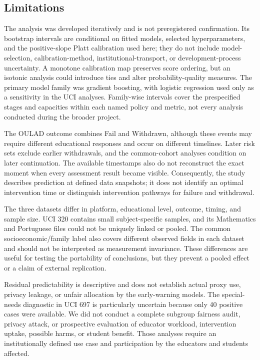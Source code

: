 \documentclass[education,article,submit,moreauthors]{Definitions/mdpi}
\begin{document}
\subsection{Limitations}

The analysis was developed iteratively and is not preregistered confirmation. Its bootstrap intervals are conditional on fitted models, selected hyperparameters, and the positive-slope Platt calibration used here; they do not include model-selection, calibration-method, institutional-transport, or development-process uncertainty. A monotone calibration map preserves score ordering, but an isotonic analysis could introduce ties and alter probability-quality measures. The primary model family was gradient boosting, with logistic regression used only as a sensitivity in the UCI analyses. Family-wise intervals cover the prespecified stages and capacities within each named policy and metric, not every analysis conducted during the broader project.

The OULAD outcome combines Fail and Withdrawn, although these events may require different educational responses and occur on different timelines. Later risk sets exclude earlier withdrawals, and the common-cohort analyses condition on later continuation. The available timestamps also do not reconstruct the exact moment when every assessment result became visible. Consequently, the study describes prediction at defined data snapshots; it does not identify an optimal intervention time or distinguish intervention pathways for failure and withdrawal.

The three datasets differ in platform, educational level, outcome, timing, and sample size. UCI 320 contains small subject-specific samples, and its Mathematics and Portuguese files could not be uniquely linked or pooled. The common socioeconomic/family label also covers different observed fields in each dataset and should not be interpreted as measurement invariance. These differences are useful for testing the portability of conclusions, but they prevent a pooled effect or a claim of external replication.

Residual predictability is descriptive and does not establish actual proxy use, privacy leakage, or unfair allocation by the early-warning models. The special-needs diagnostic in UCI 697 is particularly uncertain because only 40 positive cases were available. We did not conduct a complete subgroup fairness audit, privacy attack, or prospective evaluation of educator workload, intervention uptake, possible harms, or student benefit. Those analyses require an institutionally defined use case and participation by the educators and students affected.
\end{document}
